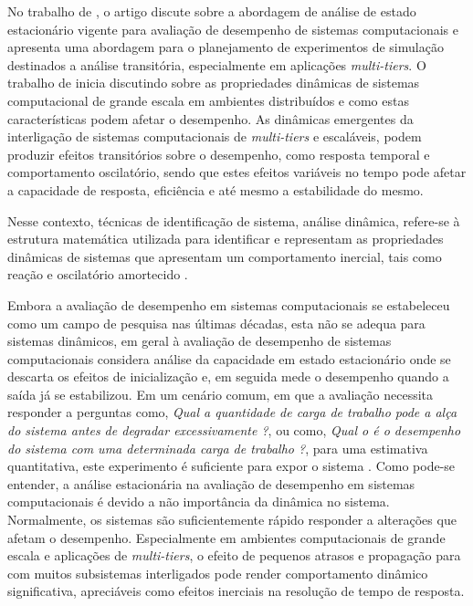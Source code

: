 No trabalho de \cite{Lourenco2015}, o artigo discute sobre a abordagem de análise de estado estacionário vigente para avaliação de desempenho de sistemas computacionais e apresenta uma abordagem para o planejamento de experimentos de simulação destinados a análise transitória, especialmente em aplicações \textit{multi-tiers}.
O trabalho de \cite{Lourenco2015} inicia discutindo sobre as propriedades dinâmicas de sistemas computacional de grande escala em ambientes distribuídos e como estas características podem afetar o desempenho. As dinâmicas emergentes da interligação de sistemas computacionais de \textit{multi-tiers} e escaláveis, podem produzir efeitos transitórios sobre o desempenho, como resposta temporal e comportamento oscilatório, sendo que estes efeitos variáveis no tempo pode afetar a capacidade de resposta, eficiência e até mesmo a estabilidade do mesmo. 

\begin{citacao}
	Nesse contexto, técnicas de identificação de sistema, análise dinâmica, refere-se à estrutura matemática utilizada para identificar e representam as propriedades dinâmicas de sistemas que apresentam um comportamento inercial, tais como reação e oscilatório amortecido \cite{Lourenco2015}. 
\end{citacao}

Embora a avaliação de desempenho em sistemas computacionais se estabeleceu como um campo de pesquisa nas últimas décadas, esta não se adequa para sistemas dinâmicos, em geral à avaliação de desempenho de sistemas computacionais considera análise da capacidade em estado estacionário onde se descarta os efeitos de inicialização e, em seguida mede o desempenho quando a saída já se estabilizou. Em um cenário comum, em que a avaliação necessita responder a perguntas como, \textit{Qual a quantidade de carga de trabalho pode a alça do sistema antes de degradar excessivamente ?}, ou como, \textit{Qual o é o desempenho do sistema com uma determinada carga de trabalho ?}, para uma estimativa quantitativa, este experimento é suficiente para expor o sistema \cite{Lourenco2015}.
Como pode-se entender, a análise estacionária na avaliação de desempenho em sistemas computacionais é devido a não importância da dinâmica no sistema. Normalmente, os sistemas são suficientemente rápido responder a alterações que afetam o desempenho. Especialmente em ambientes computacionais de grande escala e aplicações de \textit{multi-tiers}, o efeito de pequenos atrasos e propagação para com muitos subsistemas interligados pode render comportamento dinâmico significativa, apreciáveis como efeitos inerciais na resolução de tempo de resposta. 

